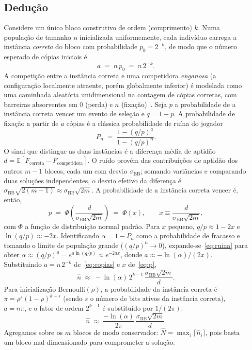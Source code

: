 \documentclass[conference]{IEEEtran}
\newcommand{\Nhat}{\hat{N}}
\newcommand{\sBB}{\sigma_{\mathrm{BB}}}
\begin{document}
\subsection{Dedução}
Considere um único bloco construtivo de ordem (comprimento) $k$. Numa população de
tamanho $n$ inicializada uniformemente, cada indivíduo carrega a instância
\emph{correta} do bloco com probabilidade $p_0=2^{-k}$, de modo que o número
esperado de cópias iniciais é
\begin{equation}
a \;=\; n\,p_0 \;=\; n\,2^{-k}.
\label{eq:copias}
\end{equation}
A competição entre a instância correta e uma competidora \emph{enganosa} (a
configuração localmente atraente, porém globalmente inferior) é modelada como uma
caminhada aleatória unidimensional na contagem de cópias corretas, com barreiras
absorventes em $0$ (perda) e $n$ (fixação)~\cite{harik1999gambler}. Seja $p$ a
probabilidade de a instância correta vencer um evento de seleção e $q=1-p$. A
probabilidade de fixação a partir de $a$ cópias é a clássica probabilidade de ruína
do jogador
\begin{equation}
P_n \;=\; \frac{1-(q/p)^{a}}{1-(q/p)^{n}} .
\label{eq:ruina}
\end{equation}
O sinal que distingue as duas instâncias é a diferença média de aptidão
$d=\mathbb{E}[F_{\text{correta}}-F_{\text{competidora}}]$. O ruído provém das
contribuições de aptidão dos outros $m-1$ blocos, cada um com desvio $\sBB$;
somando variâncias e comparando duas soluções independentes, o desvio efetivo da
diferença é $\sBB\sqrt{2(m-1)}\approx\sBB\sqrt{2m}$. A probabilidade de a instância
correta vencer é, então,
\begin{equation}
p \;=\; \Phi\!\left(\frac{d}{\sBB\sqrt{2m}}\right)\;=\;\Phi(x),
\qquad x \equiv \frac{d}{\sBB\sqrt{2m}},
\label{eq:p}
\end{equation}
com $\Phi$ a função de distribuição normal padrão. Para $x$ pequeno,
$q/p\approx 1-2x$ e $\ln(q/p)\approx -2x$. Identificando $\alpha=1-P_n$ como a
probabilidade de fracasso e tomando o limite de população grande
($(q/p)^n\to 0$), expande-se~\eqref{eq:ruina} para obter
$\alpha\approx (q/p)^{a}=e^{a\ln(q/p)}\approx e^{-2ax}$, donde
$a\approx -\ln(\alpha)/(2x)$. Substituindo $a=n\,2^{-k}$ de~\eqref{eq:copias} e
$x$ de~\eqref{eq:p},
\begin{equation}
\boxed{\;\widehat{n} \;\approx\; -\ln(\alpha)\,2^{k-1}\,
\frac{\sBB\sqrt{2m}}{d}.\;}
\label{eq:gr-final}
\end{equation}
Para inicialização Bernoulli$(\rho)$, a probabilidade da instância correta é
$\pi=\rho^{s}(1-\rho)^{k-s}$ (sendo $s$ o número de bits ativos da instância
correta), $a=n\pi$, e o fator de ordem $2^{k-1}$ é substituído por $1/(2\pi)$:
\begin{equation}
\widehat{n} \;\approx\; \frac{-\ln(\alpha)}{2\pi}\,\frac{\sBB\sqrt{2m}}{d}.
\label{eq:gr-bern}
\end{equation}
Agregamos sobre os $m$ blocos de modo conservador: $\Nhat=\max_i\lceil
\widehat{n}_i\rceil$, pois basta um bloco mal dimensionado para comprometer a
solução.
\end{document}
